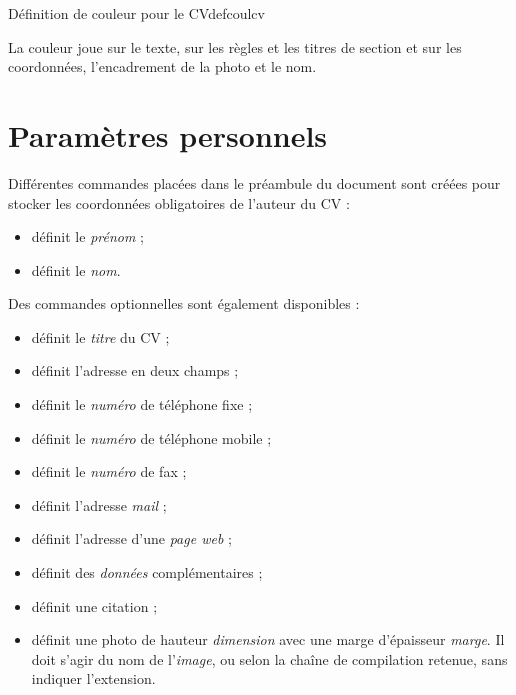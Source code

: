 \begin{codesimple}{Définition de couleur pour le CV}{defcoulcv}
\end{codesimple}


La couleur  joue sur le texte,  sur les règles et les titres de section et  sur les coordonnées, l'encadrement de la photo et le nom.


\section{Paramètres personnels}

Différentes  commandes placées dans le préambule du document sont créées pour stocker les coordonnées obligatoires de l'auteur du CV :
\begin{itemize}
\item {} définit le \emph{prénom} ; 
\item {} définit le \emph{nom}.
\end{itemize}

Des commandes optionnelles sont également disponibles :
\begin{itemize}
\item {} définit le \emph{titre} du CV ;
\item {} définit l'adresse en deux champs ;
\item {} définit le \emph{numéro} de téléphone fixe ;
\item {} définit le \emph{numéro} de téléphone mobile ;
\item {} définit le \emph{numéro} de fax ;
\item {} définit l'adresse \emph{mail} ;
\item {} définit l'adresse d'une \emph{page web} ;
\item {} définit des \emph{données} complémentaires ;
\item {} définit une citation ; 
\item {} définit une photo de hauteur \emph{dimension} avec une marge d'épaisseur \emph{marge}. Il doit s'agir du nom de l'\emph{image},  ou  selon la chaîne de compilation retenue, sans indiquer l'extension. 
\end{itemize}



